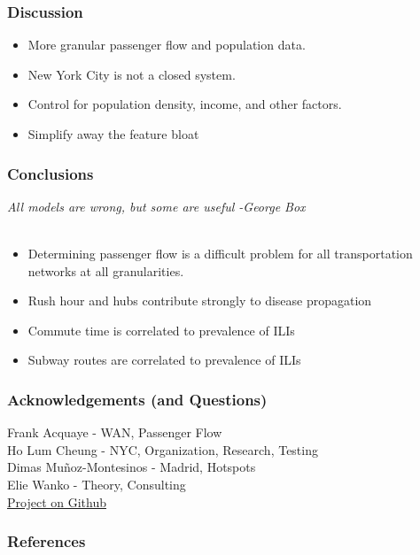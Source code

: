 \documentclass{beamer}
\begin{document}
\begin{frame}
\frametitle{Discussion}
\begin{itemize}
    \item More granular passenger flow and population data.
    \item New York City is not a closed system.
    \item Control for population density, income, and other factors.
    \item Simplify away the feature bloat
\end{itemize}
\end{frame}
\begin{frame}
\frametitle{Conclusions}
\textit{All models are wrong, but some are useful -George Box}\\~\\
\begin{itemize}
    \item Determining passenger flow is a difficult problem for all transportation networks at all granularities.
    \item Rush hour and hubs contribute strongly to disease propagation
    \item Commute time is correlated to prevalence of ILIs
    \item Subway routes are correlated to prevalence of ILIs
\end{itemize}
\end{frame}
\begin{frame}
\frametitle{Acknowledgements (and Questions)}
Frank Acquaye - WAN, Passenger Flow\\
Ho Lum Cheung - NYC, Organization, Research, Testing\\
Dimas Muñoz-Montesinos - Madrid, Hotspots\\
Elie Wanko - Theory, Consulting\\
\href{https://github.com/cheung-ho-lum/NS_Epidemics_ABM_Approach}{Project on Github}
\end{frame}
\begin{frame}[shrink=50, fragile]
\frametitle{References}


\end{frame}
\end{document}
